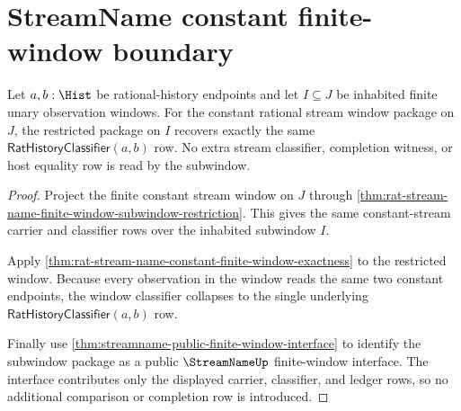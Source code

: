 \section{StreamName constant finite-window boundary}
\label{sec:streamname-constant-window-boundary}

\begin{theorem}
\label{thm:streamname-constant-window-subwindow-exactness}
Let $a,b:\Hist$ be rational-history endpoints and let
$I\subseteq J$ be inhabited finite unary observation windows. For the
constant rational stream window package on $J$, the restricted package on
$I$ recovers exactly the same $\mathsf{RatHistoryClassifier}(a,b)$ row. No
extra stream classifier, completion witness, or host equality row is read by
the subwindow.
\end{theorem}
\begin{proof}
Project the finite constant stream window on $J$ through
\autoref{thm:rat-stream-name-finite-window-subwindow-restriction}. This gives
the same constant-stream carrier and classifier rows over the inhabited
subwindow $I$.

Apply
\autoref{thm:rat-stream-name-constant-finite-window-exactness} to the
restricted window. Because every observation in the window reads the same two
constant endpoints, the window classifier collapses to the single underlying
$\mathsf{RatHistoryClassifier}(a,b)$ row.

Finally use
\autoref{thm:streamname-public-finite-window-interface} to identify the
subwindow package as a public $\StreamNameUp$ finite-window interface. The
interface contributes only the displayed carrier, classifier, and ledger rows,
so no additional comparison or completion row is introduced.
\end{proof}

